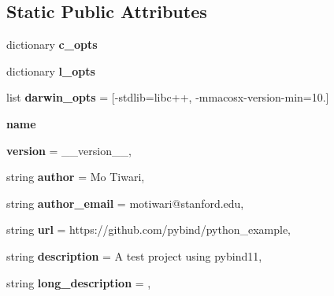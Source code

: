 \subsection*{Static Public Attributes}
\begin{DoxyCompactItemize}
\item 
dictionary {\bfseries c\+\_\+opts}
\item 
dictionary {\bfseries l\+\_\+opts}
\item 
\mbox{\label{classsetup_1_1BuildExt_a942cd42b133cc37a10e4688155676962}} 
list {\bfseries darwin\+\_\+opts} = \mbox{[}\textquotesingle{}-\/stdlib=libc++\textquotesingle{}, \textquotesingle{}-\/mmacosx-\/version-\/min=10.\textquotesingle{}\mbox{]}
\item 
\mbox{\label{classsetup_1_1BuildExt_a63cde2a550ddf707e22d4f93dc271590}} 
{\bfseries name}
\item 
\mbox{\label{classsetup_1_1BuildExt_ae0126fa9abc1ef98f9f444fa137a9cd3}} 
{\bfseries version} = \+\_\+\+\_\+version\+\_\+\+\_\+,
\item 
\mbox{\label{classsetup_1_1BuildExt_acb7fffd8091c0945d3952cabf7f488c5}} 
string {\bfseries author} = \textquotesingle{}Mo Tiwari\textquotesingle{},
\item 
\mbox{\label{classsetup_1_1BuildExt_a364654c19ddf5c6a26a11e7799121565}} 
string {\bfseries author\+\_\+email} = \textquotesingle{}motiwari@stanford.\+edu\textquotesingle{},
\item 
\mbox{\label{classsetup_1_1BuildExt_a968e2d21a5cf459eb0091efa406b8e2c}} 
string {\bfseries url} = \textquotesingle{}https\+://github.\+com/pybind/python\+\_\+example\textquotesingle{},
\item 
\mbox{\label{classsetup_1_1BuildExt_a4ddc07d45d333fc55922d5f840e1c102}} 
string {\bfseries description} = \textquotesingle{}A test project using pybind11\textquotesingle{},
\item 
\mbox{\label{classsetup_1_1BuildExt_a92bd98830f1ca88bc0806bf2883f5ab1}} 
string {\bfseries long\+\_\+description} = \textquotesingle{}\textquotesingle{},

\end{DoxyCompactItemize}
